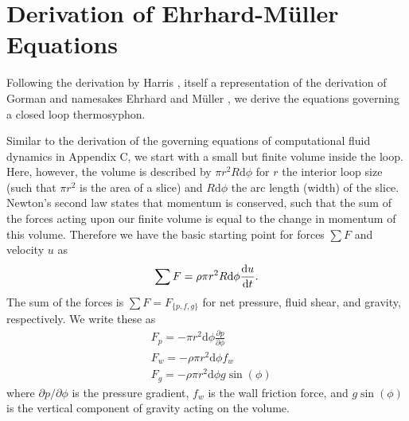\documentclass[12pt]{report}
\newcommand{\pdiff}[2]{\frac{\partial #1}{\partial #2}}
\newcommand{\diff}[2]{\frac{{\rm d}#1}{{\rm d}#2}}
\begin{document}
\chapter{Derivation of Ehrhard-M\"{u}ller Equations}

Following the derivation by Harris , itself a representation of the derivation of Gorman  and namesakes Ehrhard and M\"{u}ller , we derive the equations governing a closed loop thermosyphon.

Similar to the derivation of the governing equations of computational fluid dynamics in Appendix C, we start with a small but finite volume inside the loop.
Here, however, the volume is described by $\pi r^2 R \text{d} \phi$ for $r$ the interior loop size (such that $\pi r^2$ is the area of a slice) and $R\text{d}\phi$ the arc length (width) of the slice.
Newton's second law states that momentum is conserved, such that the sum of the forces acting upon our finite volume is equal to the change in momentum of this volume.
Therefore we have the basic starting point for forces $\sum F$ and velocity $u$ as
\begin{equation} \sum F = \rho \pi r^2 R \text{d}\phi \diff{u}{t} .\end{equation}
The sum of the forces is $\sum F = F_{\{p,f,g\}}$ for net pressure, fluid shear, and gravity, respectively.
We write these as
\begin{align} & F_p = -\pi r^2 \text{d} \phi \pdiff{p}{\phi}\\
& F_w = -\rho \pi r^2 \text{d} \phi f_w\\
& F_g = -\rho \pi r^2 \text{d} \phi g \sin (\phi)\end{align}
where $\partial p /\partial \phi$ is the pressure gradient, $f_w$ is the wall friction force, and $g \sin (\phi)$ is the vertical component of gravity acting on the volume.
\end{document}
